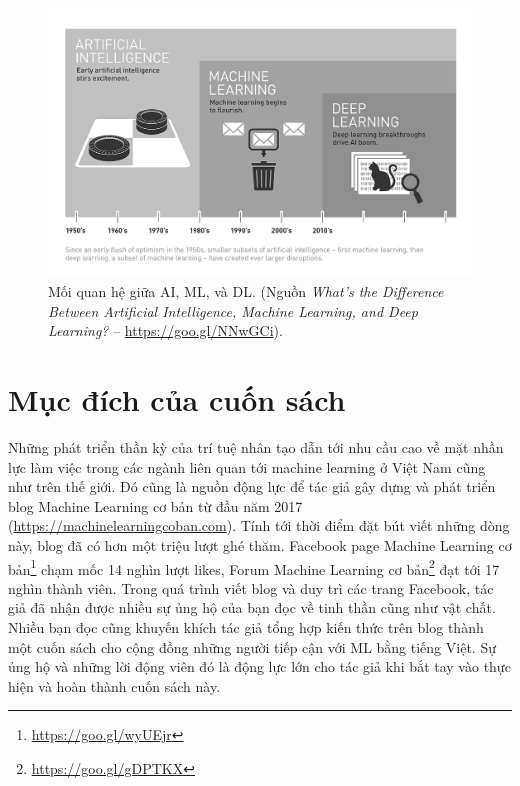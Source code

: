 \begin{figure}[]
\centering
\includegraphics[width = .9\textwidth]{Chapters/00_loinoidau/dl_gray.png}
\caption[]{Mối quan hệ giữa AI, ML, và DL. (Nguồn \textit{What’s the Difference Between Artificial
Intelligence, Machine Learning, and Deep Learning?} --
\url{https://goo.gl/NNwGCi}).}
\label{fig:0_1}
\end{figure}

\section{Mục đích của cuốn sách}
Những phát triển thần kỳ của trí tuệ nhân tạo dẫn tới nhu cầu cao về mặt nhần
lực làm việc trong các ngành liên quan tới machine learning ở Việt Nam cũng như
trên thế giới. Đó cũng là nguồn động lực để tác giả gây dựng và phát triển
blog Machine Learning cơ bản từ đầu năm 2017
(\url{https://machinelearningcoban.com}). Tính tới thời điểm đặt bút viết những
dòng này, blog đã có hơn một triệu lượt ghé thăm. Facebook page Machine Learning
cơ bản\footnote{\url{https://goo.gl/wyUEjr}} chạm mốc 14 nghìn lượt likes, Forum
Machine Learning cơ bản\footnote{\url{https://goo.gl/gDPTKX}} đạt tới 17 nghìn
thành viên. Trong quá trình viết blog và duy trì các trang Facebook, tác giả đã
nhận được nhiều sự ủng hộ của bạn đọc về tinh thần cũng như vật chất. Nhiều
bạn đọc cũng khuyến khích tác giả tổng hợp kiến thức trên blog thành một
cuốn sách cho cộng đồng những người tiếp cận với ML bằng tiếng
Việt. Sự ủng hộ và những lời động viên đó là động lực lớn cho tác giả khi bắt
tay vào thực hiện và hoàn thành cuốn sách này.


